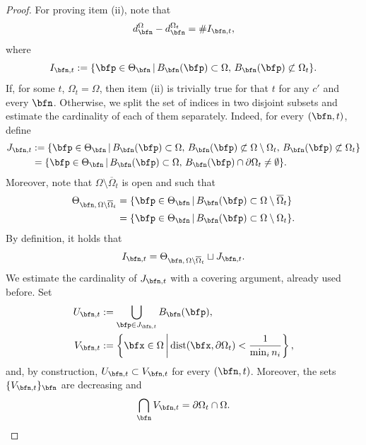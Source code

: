 \documentclass{amsart}
\begin{document}
\begin{proof}
    For proving item (ii), note that
    \begin{equation*}
        d_\bfn^{\Omega}-d_\bfn^{\Omega_t}=\#I_{\bfn,t},
    \end{equation*}
    where 
    \begin{equation*}
        I_{\bfn,t}:=\{\bfp\in\Theta_\bfn\,\vert\,B_\bfn(\bfp)\subset\Omega,\,B_\bfn(\bfp)\not\subset\Omega_t\}.
    \end{equation*}
    If, for some $t$, $\Omega_t=\Omega$, then item (ii) is trivially true for that $t$ for any $c'$ and every $\bfn$.
    Otherwise, we split the set of indices in two disjoint subsets and estimate the cardinality of each of them separately. Indeed, for every $(\bfn,t)$, define
    \begin{align*}
        J_{\bfn,t}&:=\{\bfp\in\Theta_\bfn\,\vert\,B_\bfn(\bfp)\subset\Omega,\,B_\bfn(\bfp)\not\subset\Omega\setminus\Omega_t,\,B_\bfn(\bfp)\not\subset\Omega_t\}\\
        &=\{\bfp\in\Theta_\bfn\,\vert\,B_\bfn(\bfp)\subset\Omega,\,B_\bfn(\bfp)\cap\partial\Omega_t\neq\emptyset\}.
    \end{align*}
    Moreover, note that $\Omega\setminus\overline{\Omega}_t$ is open and such that
    \begin{align*}
        \Theta_{\bfn,\,\Omega\setminus\overline{\Omega}_t}&=\{\bfp\in\Theta_\bfn\,\vert\,B_\bfn(\bfp)\subset\Omega\setminus\overline{\Omega}_t\}\\
        &=\{\bfp\in\Theta_\bfn\,\vert\,B_\bfn(\bfp)\subset\Omega\setminus\Omega_t\}.
    \end{align*}
    By definition, it holds that 
    \begin{equation*}
        I_{\bfn,t}=\Theta_{\bfn,\,\Omega\setminus\overline{\Omega}_t}\sqcup J_{\bfn,t}.
    \end{equation*}
    We estimate the cardinality of $J_{\bfn,t}$ with a covering argument, already used before. 
    Set 
    \begin{align*}
        U_{\bfn,t}&:=\bigcup\limits_{\bfp\in J_{\bfn,t}}B_\bfn(\bfp),\\
        V_{\bfn,t}&:=\left\{\bfx\in\Omega\,\bigg\vert\,\mathrm{dist}(\bfx,\partial\Omega_t)<\frac{1}{\min_i n_i}\right\},
    \end{align*}
    and, by construction, $U_{\bfn,t}\subset V_{\bfn,t}$ for every $(\bfn,t)$. Moreover, the sets $\{V_{\bfn,t}\}_\bfn$ are decreasing and 
    \begin{equation*}
        \bigcap_{\bfn}V_{\bfn,t}=\partial\Omega_t\cap\Omega.

\end{equation*}
\end{proof}
\end{document}
